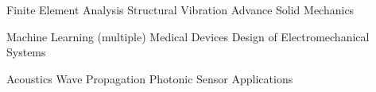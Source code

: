 
\begin{coursework}


  \cvcoursev
    {Finite Element Analysis}
    {Structural Vibration}
    {Advance Solid Mechanics}

  \cvcoursev
    {Machine Learning (multiple)}
    {Medical Devices}
    {Design of Electromechanical Systems}
   
  \cvcoursev
    {Acoustics}
    {Wave Propagation}
    {Photonic Sensor Applications}
\end{coursework}
